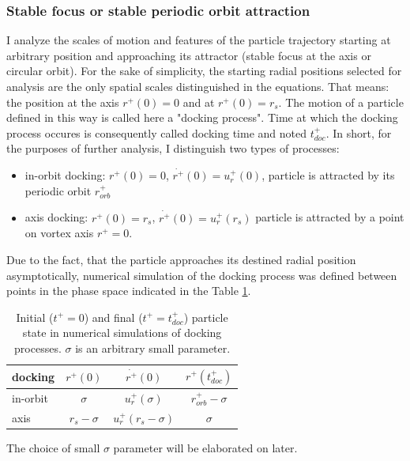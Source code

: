 \documentclass[../main.tex]{subfiles}
\begin{document}
\subsubsection{Stable focus or stable periodic orbit attraction}
I analyze the scales of motion and features of the particle trajectory starting at arbitrary position and approaching its attractor (stable focus at the axis or circular orbit). For the sake of simplicity, the starting radial positions selected for analysis are the only spatial scales distinguished in the equations. That means: the position at the axis $r^+(0)=0$ and at $r^+(0)=r_s$. The motion of a particle defined in this way is called here a "docking process". Time at which the docking process occures is consequently called docking time and noted $t^+_{doc}$. In short, for the purposes of further analysis, I distinguish two types of processes:
\begin{itemize}
\item in-orbit docking: $r^+(0)=0$, $\dot{r^+}(0)=u_r^+(0)$, particle is attracted by its periodic orbit $r^+_{orb}$
\item axis docking: $r^+(0)=r_s$, $\dot{r^+}(0)=u_r^+(r_s)$ particle is attracted by a point on vortex axis $r^+=0$.
\end{itemize}
Due to the fact, that the particle approaches its destined radial position asymptotically, numerical simulation of the docking process was defined between points in the phase space indicated in the Table \ref{tab:ch3_1}.

\begin{table}
\small
\tabcolsep=0.2cm
\centering
\caption{Initial ($t^+=0$) and final ($t^+=t^+_{doc}$) particle state in numerical simulations of docking processes. $\sigma$ is an arbitrary small parameter.}
\centering
\begin{tabular}{|l||c|c|c|}
\hline 
docking& $r^+(0)$ & $\dot{r^+}(0)$ & $r^+(t^+_{doc})$\\
\hline \hline
in-orbit & $\sigma$ & $u^+_r(\sigma)$ & $r^+_{orb}-\sigma$\\
\hline
axis & $r_s-\sigma$ & $u_r^+(r_s-\sigma)$ & $\sigma$\\
\hline
\end{tabular}
\label{tab:ch3_1}
\end{table}

The choice of small $\sigma$ parameter will be elaborated on later.\\
\end{document}
